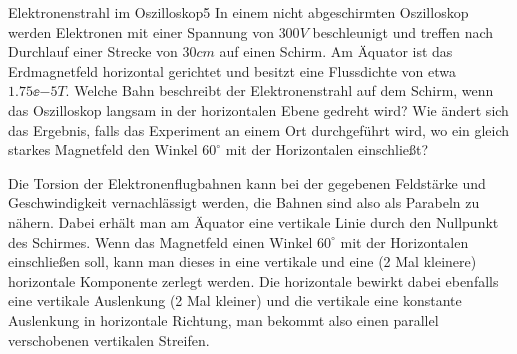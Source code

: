 \begin{problem}{Elektronenstrahl im Oszilloskop}{5}
In einem nicht abgeschirmten Oszilloskop werden Elektronen mit einer Spannung von $300 \unit{V}$ beschleunigt und treffen nach Durchlauf einer Strecke von $30 \unit{cm}$ auf einen Schirm. Am Äquator ist das Erdmagnetfeld horizontal gerichtet und besitzt eine Flussdichte von etwa $1.75\ee{-5} \unit{T}$. Welche Bahn beschreibt der Elektronenstrahl auf dem Schirm, wenn das Oszilloskop langsam in der horizontalen Ebene gedreht wird? Wie ändert sich das Ergebnis, falls das Experiment an einem Ort durchgeführt wird, wo ein gleich starkes Magnetfeld den Winkel $60^\circ$ mit der Horizontalen einschließt?
\begin{solution}
Die Torsion der Elektronenflugbahnen kann bei der gegebenen Feldstärke und Geschwindigkeit vernachlässigt werden, die Bahnen sind also als Parabeln zu nähern. Dabei erhält man am Äquator eine vertikale Linie durch den Nullpunkt des Schirmes. Wenn das Magnetfeld einen Winkel $60^\circ$ mit der Horizontalen einschließen soll, kann man dieses in eine vertikale und eine (2 Mal kleinere) horizontale Komponente zerlegt werden. Die horizontale bewirkt dabei ebenfalls eine vertikale Auslenkung (2 Mal kleiner) und die vertikale eine konstante Auslenkung in horizontale Richtung, man bekommt also einen parallel verschobenen vertikalen Streifen.
\end{solution}
\end{problem}

